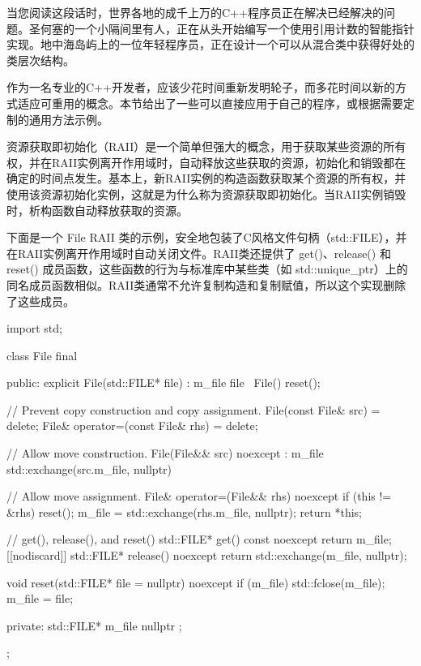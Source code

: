 
当您阅读这段话时，世界各地的成千上万的C++程序员正在解决已经解决的问题。圣何塞的一个小隔间里有人，正在从头开始编写一个使用引用计数的智能指针实现。地中海岛屿上的一位年轻程序员，正在设计一个可以从混合类中获得好处的类层次结构。

作为一名专业的C++开发者，应该少花时间重新发明轮子，而多花时间以新的方式适应可重用的概念。本节给出了一些可以直接应用于自己的程序，或根据需要定制的通用方法示例。


资源获取即初始化（RAII）是一个简单但强大的概念，用于获取某些资源的所有权，并在RAII实例离开作用域时，自动释放这些获取的资源，初始化和销毁都在确定的时间点发生。基本上，新RAII实例的构造函数获取某个资源的所有权，并使用该资源初始化实例，这就是为什么称为资源获取即初始化。当RAII实例销毁时，析构函数自动释放获取的资源。

下面是一个 File RAII 类的示例，安全地包装了C风格文件句柄（std::FILE），并在RAII实例离开作用域时自动关闭文件。RAII类还提供了 get()、release() 和 reset() 成员函数，这些函数的行为与标准库中某些类（如 std::unique\_ptr）上的同名成员函数相似。RAII类通常不允许复制构造和复制赋值，所以这个实现删除了这些成员。

\begin{cpp}
import std;

class File final
{
    public:
        explicit File(std::FILE* file) : m_file { file } { }
        ~File() { reset(); }

        // Prevent copy construction and copy assignment.
        File(const File& src) = delete;
        File& operator=(const File& rhs) = delete;

        // Allow move construction.
        File(File&& src) noexcept : m_file { std::exchange(src.m_file, nullptr) }
        {
        }

        // Allow move assignment.
        File& operator=(File&& rhs) noexcept
        {
            if (this != &rhs) {
                reset();
                m_file = std::exchange(rhs.m_file, nullptr);
            }
            return *this;
        }

        // get(), release(), and reset()
        std::FILE* get() const noexcept { return m_file; }
        [[nodiscard]] std::FILE* release() noexcept
        {
            return std::exchange(m_file, nullptr);
        }

        void reset(std::FILE* file = nullptr) noexcept
        {
            if (m_file) { std::fclose(m_file); }
            m_file = file;
        }

    private:
        std::FILE* m_file { nullptr };
};
\end{cpp}

